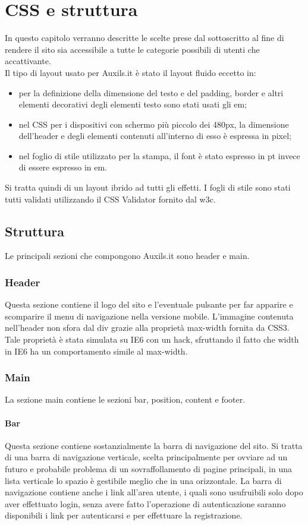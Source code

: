 \section{CSS e struttura}
In questo capitolo verranno descritte le scelte prese dal sottoscritto al fine di rendere il sito sia accessibile a tutte le categorie possibili di utenti che accattivante.\\ 
Il tipo di layout usato per Auxils.it è stato il layout fluido eccetto in:
\begin{itemize}
 \item per la definizione della dimensione del testo e del padding, border e altri elementi decorativi degli elementi testo sono stati usati gli em;
 \item nel CSS per i dispositivi con schermo più piccolo dei 480px, la dimensione dell'header e degli elementi contenuti all'interno di esso è espressa in pixel;
 \item nel foglio di stile utilizzato per la stampa, il font è stato espresso in pt invece di essere espresso in em.
\end{itemize} 
Si tratta quindi di un layout ibrido ad tutti gli effetti.
I fogli di stile sono stati tutti validati utilizzando il CSS Validator fornito dal w3c.
\subsection{Struttura}
Le principali sezioni che compongono Auxils.it sono header e main.
\subsubsection{Header}
Questa sezione contiene il logo del sito e l'eventuale pulsante per far apparire e scomparire il menu di navigazione nella versione mobile. L'immagine contenuta nell'header non sfora dal div grazie alla proprietà max-width fornita da CSS3. Tale proprietà è stata simulata su IE6 con un hack, sfruttando il fatto che width in IE6 ha un comportamento simile al max-width.
\subsubsection{Main}
La sezione main contiene le sezioni bar, position, content e footer.

\paragraph{Bar}
Questa sezione contiene sostanzialmente la barra di navigazione del sito. Si tratta di una barra di navigazione verticale, scelta principalmente per ovviare ad un futuro e probabile problema di un sovraffollamento di pagine principali, in una lista verticale lo spazio è gestibile meglio che in una orizzontale. La barra di navigazione contiene anche i link all'area utente, i quali sono usufruibili solo dopo aver effettuato login, senza avere fatto l'operazione di autenticazione saranno disponibili i link per autenticarsi e per effettuare la registrazione.

